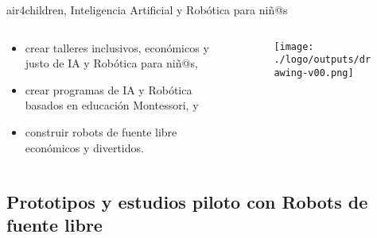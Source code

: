 {
\begin{frame}{
air4children, 
Inteligencia Artificial y Rob\'otica para ni\~n@s
}
 
  \begin{columns}
  \begin{column}{.7\linewidth}

  \begin{itemize}
    \item crear talleres inclusivos, econ\'omicos y justo de IA y Rob\'otica para ni\~n@s, 
    \item crear programas de IA y Rob\'otica basados en educaci\'on Montessori, y
    \item construir robots de fuente libre econ\'omicos y divertidos.
  \end{itemize}

    \end{column}


  \begin{column}{.4\linewidth}

      \begin{figure}
        \centering
        \texttt{[image: ./logo/outputs/drawing-v00.png]}
      \end{figure}

    \end{column}
  \end{columns}

\end{frame}
}




\subsection{
Prototipos y estudios piloto con Robots de fuente libre
}

